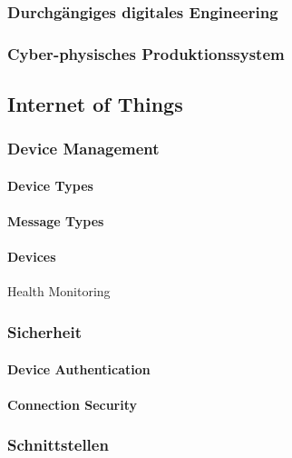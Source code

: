\subsubsection{Durchgängiges digitales Engineering}

\subsubsection{Cyber-physisches Produktionssystem}

\subsection{Internet of Things}

\subsubsection{Device Management}

\paragraph{Device Types}

\paragraph{Message Types}

\paragraph{Devices}
Health Monitoring\\

\subsubsection{Sicherheit}

\paragraph{Device Authentication}

\paragraph{Connection Security}

\subsubsection{Schnittstellen}

